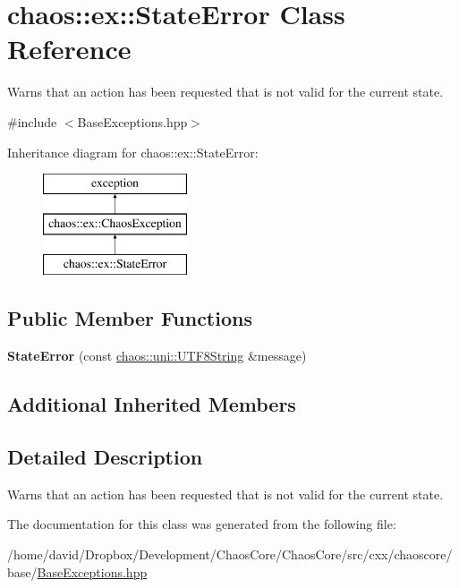 \hypertarget{classchaos_1_1ex_1_1_state_error}{\section{chaos\-:\-:ex\-:\-:State\-Error Class Reference}
\label{classchaos_1_1ex_1_1_state_error}
}


Warns that an action has been requested that is not valid for the current state.  




{\ttfamily \#include $<$Base\-Exceptions.\-hpp$>$}

Inheritance diagram for chaos\-:\-:ex\-:\-:State\-Error\-:\begin{figure}[H]
\begin{center}
\leavevmode
\includegraphics[height=3.000000cm]{classchaos_1_1ex_1_1_state_error}
\end{center}
\end{figure}
\subsection*{Public Member Functions}
\begin{DoxyCompactItemize}
\item 
\hypertarget{classchaos_1_1ex_1_1_state_error_abb2ed9dc030b7fbcb3c76a46d62da4ad}{{\bfseries State\-Error} (const \hyperlink{classchaos_1_1uni_1_1_u_t_f8_string}{chaos\-::uni\-::\-U\-T\-F8\-String} \&message)}\label{classchaos_1_1ex_1_1_state_error_abb2ed9dc030b7fbcb3c76a46d62da4ad}

\end{DoxyCompactItemize}
\subsection*{Additional Inherited Members}


\subsection{Detailed Description}
Warns that an action has been requested that is not valid for the current state. 

The documentation for this class was generated from the following file\-:\begin{DoxyCompactItemize}
\item 
/home/david/\-Dropbox/\-Development/\-Chaos\-Core/\-Chaos\-Core/src/cxx/chaoscore/base/\hyperlink{_base_exceptions_8hpp}{Base\-Exceptions.\-hpp}\end{DoxyCompactItemize}

